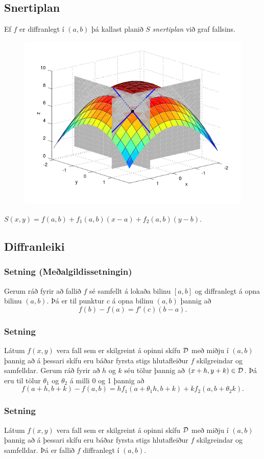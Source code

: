 \subsection{Snertiplan}
  Ef $f$ er diffranlegt í $(a,b)$ þá kallast planið $S$ \emph{snertiplan} við graf fallsins.
  \begin{figure}
           \centering
            \includegraphics[width=0.6\linewidth]{bothpart.png}
    \end{figure}
    $S(x,y) = f(a,b) + f_1(a,b)(x-a)+f_2(a,b)(y-b)$.



\subsection{Diffranleiki} 

\subsubsection{Setning  (Meðalgildissetningin)}
Gerum ráð fyrir að fallið $f$
sé samfellt á lokaða bilinu $[a,b]$ og diffranlegt á opna bilinu
$(a,b)$.  Þá er til punktur $c$ á opna bilinu $(a,b)$ þannig að 
$$f(b)-f(a)=f'(c)(b-a).$$




\subsubsection{Setning }

Látum  $f(x,y)$ vera fall
sem er skilgreint á opinni 
skífu $\cal D$ með miðju í $(a,b)$ þannig að á þessari skífu eru báðar
fyrsta stigs hlutafleiður $f$ skilgreindar og samfelldar.  Gerum ráð fyrir að $h$
og $k$ séu tölur þannig að $(x+h, y+k)\in{\cal D}$.  Þá eru til tölur
$\theta_1$ og $\theta_2$ á milli 0 og 1 þannig að 
$$f(a+h,b+k)-f(a,b)=hf_1(a+\theta_1h,b+k)+kf_2(a,b+\theta_2k).$$


\subsubsection{Setning }
  Látum  $f(x,y)$ vera fall
sem er skilgreint á opinni 
skífu $\cal D$ með miðju í $(a,b)$ þannig að á þessari skífu eru báðar
fyrsta stigs hlutafleiður $f$ skilgreindar og samfelldar. 
Þá er fallið $f$ diffranlegt í $(a,b)$.




